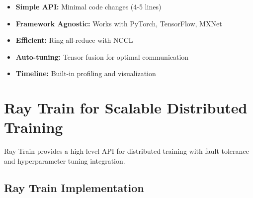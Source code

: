 \begin{itemize}
    \item \textbf{Simple API:} Minimal code changes (4-5 lines)
    \item \textbf{Framework Agnostic:} Works with PyTorch, TensorFlow, MXNet
    \item \textbf{Efficient:} Ring all-reduce with NCCL
    \item \textbf{Auto-tuning:} Tensor fusion for optimal communication
    \item \textbf{Timeline:} Built-in profiling and visualization
\end{itemize}

\section{Ray Train for Scalable Distributed Training}

Ray Train provides a high-level API for distributed training with fault tolerance and hyperparameter tuning integration.

\subsection{Ray Train Implementation}

